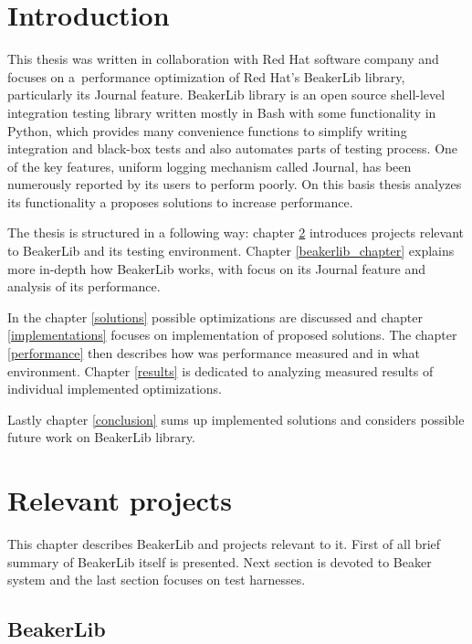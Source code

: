 
\chapter{Introduction}

This thesis was written in collaboration with Red Hat software company and focuses on a~performance optimization of Red Hat's BeakerLib library, particularly its Journal feature. BeakerLib library is an open source shell-level integration testing library written mostly in Bash with some functionality in Python, which provides many convenience functions to simplify writing integration and black-box tests and also automates parts of testing process. One of the key features, uniform logging mechanism called Journal, has been numerously reported by its users to perform poorly. On this basis thesis analyzes its functionality  a proposes solutions to increase performance.

The thesis is structured in a following way: chapter \ref{relevant_projects} introduces projects relevant to BeakerLib and its testing environment. Chapter \ref{beakerlib_chapter} explains more in-depth how BeakerLib works, with focus on its Journal feature and analysis of its performance. 

In the chapter \ref{solutions} possible optimizations are discussed and chapter \ref{implementations} focuses on implementation of proposed solutions. The chapter \ref{performance} then describes how was performance measured and in what environment. Chapter \ref{results} is dedicated to analyzing measured results of individual implemented optimizations.

Lastly chapter \ref{conclusion} sums up implemented solutions and considers possible future work on BeakerLib library.

\chapter{Relevant projects}
\label{relevant_projects}

This chapter describes BeakerLib and projects relevant to it. First of all brief summary of BeakerLib itself is presented. Next section is devoted to Beaker system and the last section focuses on test harnesses.

\section{BeakerLib}

